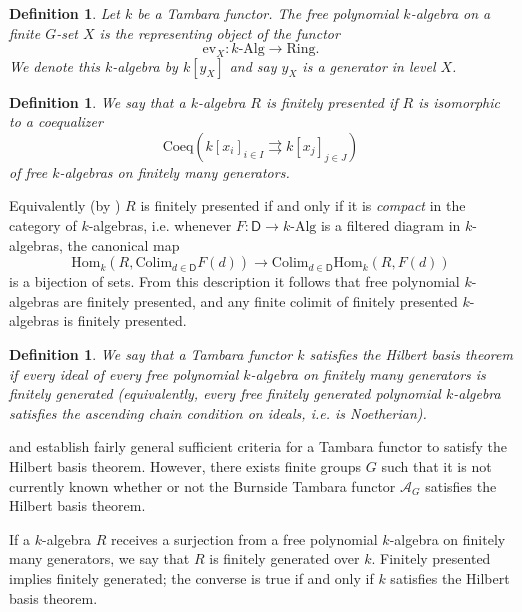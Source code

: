 \documentclass[11pt,dvipsnames]{amsart}
\newcommand{\A}{\mathcal{A}}
\theoremstyle{BoldRemark}
\newtheorem{definition}[theorem]{Definition}
\newcommand{\Hom}{\mathrm{Hom}}
\newcommand{\colim}{\mathrm{Colim}}
\newcommand{\ev}{\mathrm{ev}}
\newcommand{\Alg}{\mathrm{Alg}}
\newcommand{\Ring}{\mathrm{Ring}}
\begin{document}
\begin{definition}
    Let $k$ be a Tambara functor. The free polynomial $k$-algebra on a finite $G$-set $X$ is the representing object of the functor 
    \[ 
        \ev_X : k \text{-} \Alg \rightarrow \Ring . 
    \]
    We denote this $k$-algebra by $k[y_X]$ and say $y_X$ is a generator in level $X$.
\end{definition}

\begin{definition}
    We say that a $k$-algebra $R$ is \emph{finitely presented} if $R$ is isomorphic to a coequalizer
    \[ 
        \mathrm{Coeq}(k[x_i]_{i \in I} \rightrightarrows k[x_j]_{j \in J}) 
    \]
    of free $k$-algebras on finitely many generators.
\end{definition}

Equivalently (by \cite[Proposition 4.3]{SSW24}) $R$ is finitely presented if and only if it is \emph{compact} in the category of $k$-algebras, i.e. whenever $F : \mathsf{D} \rightarrow k \text{-} \Alg$ is a filtered diagram in $k$-algebras, the canonical map
\[ 
    \Hom_k(R, \colim_{d \in \mathsf{D}} F(d)) \rightarrow \colim_{d \in \mathsf{D}} \Hom_k(R,F(d))
\] 
is a bijection of sets. From this description it follows that free polynomial $k$-algebras are finitely presented, and any finite colimit of finitely presented $k$-algebras is finitely presented.

\begin{definition}
    We say that a Tambara functor $k$ satisfies the \emph{Hilbert basis theorem} if every ideal of every free polynomial $k$-algebra on finitely many generators is finitely generated (equivalently, every free finitely generated polynomial $k$-algebra satisfies the ascending chain condition on ideals, i.e. is Noetherian).
\end{definition}

\cite[Corollary 3.12]{4DS} and \cite[Theorems A and C]{Sun25} establish fairly general sufficient criteria for a Tambara functor to satisfy the Hilbert basis theorem. However, there exists finite groups $G$ such that it is not currently known whether or not the Burnside Tambara functor $\A_G$ satisfies the Hilbert basis theorem.

If a $k$-algebra $R$ receives a surjection from a free polynomial $k$-algebra on finitely many generators, we say that $R$ is finitely generated over $k$. Finitely presented implies finitely generated; the converse is true if and only if $k$ satisfies the Hilbert basis theorem.
\end{document}
